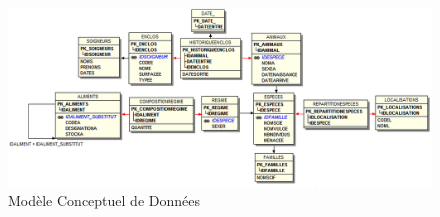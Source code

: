 \documentclass[12pt,a4paper,titlepage]{report}
\newenvironment{changemargin}[2]{\begin{list}{}{%
\setlength{\topsep}{0pt}%
\setlength{\leftmargin}{0pt}%
\setlength{\rightmargin}{0pt}%
\setlength{\listparindent}{\parindent}%
\setlength{\itemindent}{\parindent}%
\setlength{\parsep}{0pt plus 1pt}%
\addtolength{\leftmargin}{#1}%
\addtolength{\rightmargin}{#2}%
}\item }{\end{list}}
\begin{document}
\begin{figure}[h!]
	\begin{changemargin}{-3.5cm}{-4cm}
	\centering
   \includegraphics[angle=-90, scale=0.85]{MLR_17-12-2014version3.png}
   \caption{\label{étiquette} Modèle Conceptuel de Données}
   \end{changemargin}
\end{figure}	
\end{document}
